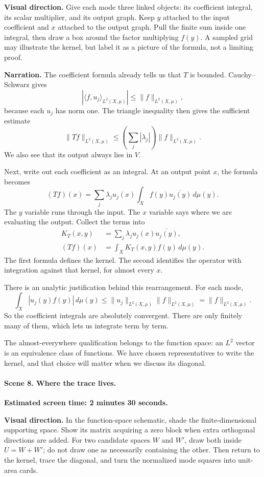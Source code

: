 \textbf{Visual direction.} Give each mode three linked objects: its coefficient integral, its scalar multiplier, and its output graph. Keep $y$ attached to the input coefficient and $x$ attached to the output graph. Pull the finite sum inside one integral, then draw a box around the factor multiplying $f(y)$. A sampled grid may illustrate the kernel, but label it as a picture of the formula, not a limiting proof.

\textbf{Narration.} The coefficient formula already tells us that $T$ is bounded. Cauchy--Schwarz gives
\[
|\langle f,u_j\rangle_{L^2(X,\mu)}|
\leq\|f\|_{L^2(X,\mu)},
\]
because each $u_j$ has norm one. The triangle inequality then gives the sufficient estimate
\[
\|Tf\|_{L^2(X,\mu)}
\leq\left(\sum_j|\lambda_j|\right)\|f\|_{L^2(X,\mu)}.
\]
We also see that its output always lies in $V$.

Next, write out each coefficient as an integral. At an output point $x$, the formula becomes
\[
(Tf)(x)=\sum_j\lambda_j u_j(x)
\int_X f(y)\overline{u_j(y)}\,d\mu(y).
\]
The $y$ variable runs through the input. The $x$ variable says where we are evaluating the output. Collect the terms into
\[
\begin{aligned}
K_T(x,y)&=\sum_j\lambda_j u_j(x)\overline{u_j(y)},\\
(Tf)(x)&=\int_X K_T(x,y)f(y)\,d\mu(y).
\end{aligned}
\]
The first formula defines the kernel. The second identifies the operator with integration against that kernel, for almost every $x$.

There is an analytic justification behind this rearrangement. For each mode,
\[
\int_X|u_j(y)f(y)|\,d\mu(y)
\leq\|u_j\|_{L^2(X,\mu)}\|f\|_{L^2(X,\mu)}
=\|f\|_{L^2(X,\mu)}.
\]
So the coefficient integrals are absolutely convergent. There are only finitely many of them, which lets us integrate term by term.

The almost-everywhere qualification belongs to the function space: an $L^2$ vector is an equivalence class of functions. We have chosen representatives to write the kernel, and that choice will matter when we discuss its diagonal.

\paragraph{Scene 8. Where the trace lives.}
\textbf{Estimated screen time: 2 minutes 30 seconds.}

\textbf{Visual direction.} In the function-space schematic, shade the finite-dimensional supporting space. Show its matrix acquiring a zero block when extra orthogonal directions are added. For two candidate spaces $W$ and $W'$, draw both inside $U=W+W'$; do not draw one as necessarily containing the other. Then return to the kernel, trace the diagonal, and turn the normalized mode squares into unit-area cards.

